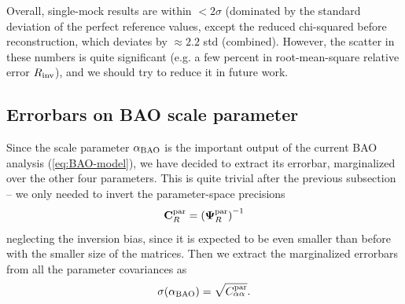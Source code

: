 Overall, \rascalc{} single-mock results are within $<2\sigma$ (dominated by the standard deviation of the perfect reference values, except the reduced chi-squared before reconstruction, which deviates by $\approx 2.2$ std (combined).
However, the scatter in these numbers is quite significant (e.g. a few percent in root-mean-square relative error $R_{\rm inv}$), and we should try to reduce it in future work.

\subsection{Errorbars on BAO scale parameter}
\label{subsec:bao-scale-validation}

Since the scale parameter $\alpha_{\rm BAO}$ is the important output of the current BAO analysis (\cref{eq:BAO-model}), we have decided to extract its errorbar, marginalized over the other four parameters.
This is quite trivial after the previous subsection -- we only needed to invert the \rascalc{} parameter-space precisions
\begin{equation} \label{eq:rascalc-parameter-cov}
{\bf C}^{\rm par}_R = {\left( {\bf \Psi}^{\rm par}_R \right)}^{-1}
\end{equation}
neglecting the inversion bias, since it is expected to be even smaller than before with the smaller size of the matrices.
Then we extract the marginalized errorbars from all the parameter covariances as
\begin{equation}
\sigma(\alpha_{\rm BAO}) = \sqrt{C^{\rm par}_{\alpha\alpha}}.
\end{equation}

